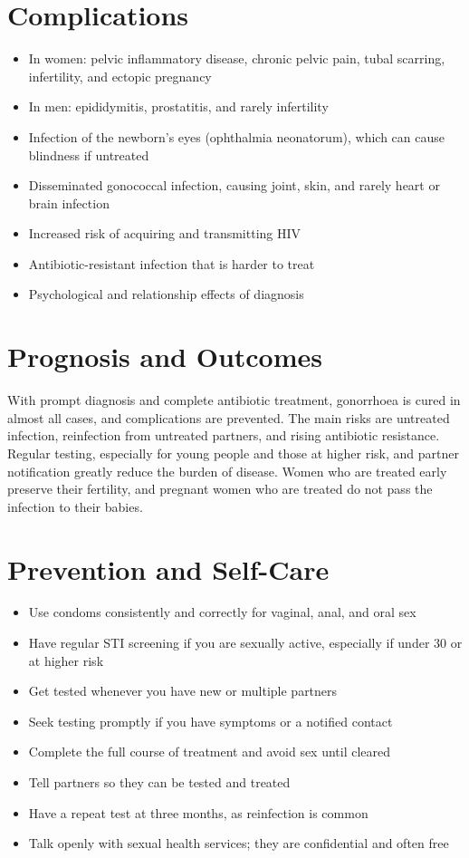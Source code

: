 \section*{Complications}
\begin{itemize}
    \item In women: pelvic inflammatory disease, chronic pelvic pain, tubal scarring, infertility, and ectopic pregnancy
    \item In men: epididymitis, prostatitis, and rarely infertility
    \item Infection of the newborn's eyes (ophthalmia neonatorum), which can cause blindness if untreated
    \item Disseminated gonococcal infection, causing joint, skin, and rarely heart or brain infection
    \item Increased risk of acquiring and transmitting HIV
    \item Antibiotic-resistant infection that is harder to treat
    \item Psychological and relationship effects of diagnosis
\end{itemize}

\section*{Prognosis and Outcomes}
With prompt diagnosis and complete antibiotic treatment, gonorrhoea is cured in almost all cases, and complications are prevented. The main risks are untreated infection, reinfection from untreated partners, and rising antibiotic resistance. Regular testing, especially for young people and those at higher risk, and partner notification greatly reduce the burden of disease. Women who are treated early preserve their fertility, and pregnant women who are treated do not pass the infection to their babies.

\section*{Prevention and Self-Care}
\begin{itemize}
    \item Use condoms consistently and correctly for vaginal, anal, and oral sex
    \item Have regular STI screening if you are sexually active, especially if under 30 or at higher risk
    \item Get tested whenever you have new or multiple partners
    \item Seek testing promptly if you have symptoms or a notified contact
    \item Complete the full course of treatment and avoid sex until cleared
    \item Tell partners so they can be tested and treated
    \item Have a repeat test at three months, as reinfection is common
    \item Talk openly with sexual health services; they are confidential and often free
\end{itemize}

